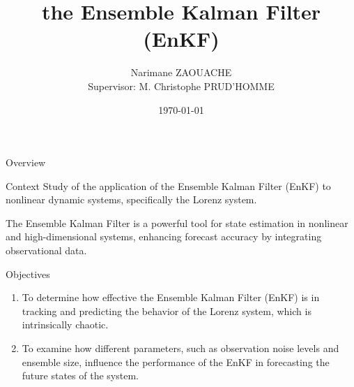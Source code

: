 \documentclass[aspectratio=169,xcolor=dvipsnames, t]{beamer}
\title[the Ensemble Kalman Filter (EnKF)]{the Ensemble Kalman Filter (EnKF)}
\author[N. ZAOUACHE]{Narimane ZAOUACHE \\[5mm]{\small Supervisor: M. Christophe PRUD’HOMME}}
\institute[]{University of Strasbourg}
\date{\today} %
\begin{document}
\maketitlepage

\begin{frame}[t]{Overview}
    \tableofcontents
\end{frame}


\begin{frame}{Context}
    Study of the application of the Ensemble Kalman Filter (EnKF) to nonlinear dynamic systems, specifically the Lorenz system.
\begin{block}{}
    The Ensemble Kalman Filter\cite{wikipediaEnKF} is a powerful tool for state estimation in nonlinear and high-dimensional systems, enhancing forecast accuracy by integrating observational data.

\end{block}


\end{frame}

\begin{frame}{Objectives}
    \begin{enumerate}
        \item To determine how effective the Ensemble Kalman Filter (EnKF) is in tracking and predicting the behavior of the Lorenz system, which is intrinsically chaotic.
        \item To examine how different parameters, such as observation noise levels and ensemble size, influence the performance of the EnKF in forecasting the future states of the system.
    \end{enumerate}
\end{frame}

\end{document}
